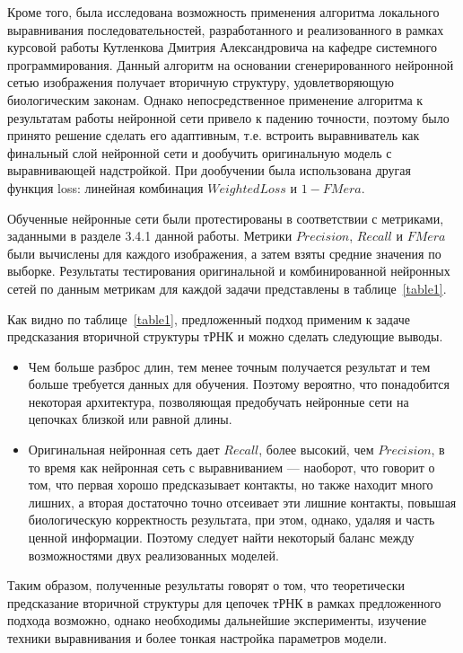 \documentclass[14pt]{matmex-diploma-custom}
\begin{document}
Кроме того, была исследована возможность применения алгоритма локального выравнивания последовательностей, разработанного и реализованного в рамках курсовой работы Кутленкова Дмитрия Александровича на кафедре системного программирования. Данный алгоритм на основании сгенерированного нейронной сетью изображения получает вторичную структуру, удовлетворяющую биологическим законам. Однако непосредственное применение алгоритма к результатам работы нейронной сети привело к падению точности, поэтому было принято решение сделать его адаптивным, т.е. встроить выравниватель как финальный слой нейронной сети и дообучить оригинальную модель с выравнивающей надстройкой. При дообучении была использована другая функция loss: линейная комбинация $WeightedLoss$ и $1 - FMera$. 


Обученные нейронные сети были протестированы в соответствии с метриками, заданными в разделе 3.4.1 данной работы. Метрики $Precision$, $Recall$ и $FMera$ были вычислены для каждого изображения, а затем взяты средние значения по выборке.
Результаты тестирования оригинальной и комбинированной нейронных сетей по данным метрикам для каждой задачи представлены в таблице~\ref{table1}.



Как видно по таблице~\ref{table1}, предложенный подход применим к задаче предсказания вторичной структуры тРНК и можно сделать следующие выводы.
\begin{itemize}
    \item Чем больше разброс длин, тем менее точным получается результат и тем больше требуется данных для обучения. Поэтому вероятно, что понадобится некоторая архитектура, позволяющая предобучать нейронные сети на цепочках близкой или равной длины.
    \item Оригинальная нейронная сеть дает $Recall$, более высокий, чем $Precision$, в то время как нейронная сеть с выравниванием --- наоборот, что говорит о том, что первая хорошо предсказывает контакты, но также находит много лишних, а вторая достаточно точно отсеивает эти лишние контакты, повышая биологическую корректность результата, при этом, однако, удаляя и часть ценной информации. Поэтому следует найти некоторый баланс между возможностями двух реализованных моделей.
\end{itemize}

Таким образом, полученные результаты говорят о том, что теоретически предсказание вторичной структуры для цепочек тРНК в рамках предложенного подхода возможно, однако необходимы дальнейшие эксперименты, изучение техники выравнивания и более тонкая настройка параметров модели.
\end{document}
